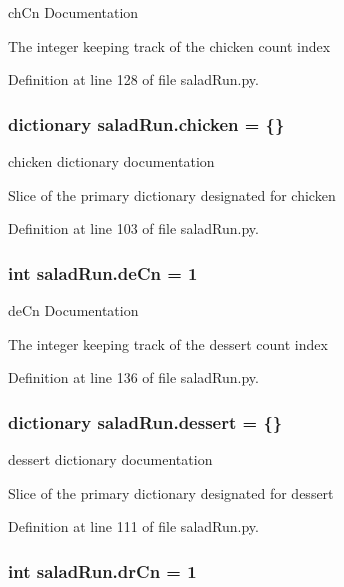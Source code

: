 ch\-Cn Documentation 

The integer keeping track of the chicken count index 

Definition at line 128 of file salad\-Run.\-py.

\hypertarget{namespacesaladRun_a7d8f9a41af35fcb57da7f604d8c726a2}{
\subsubsection[{chicken}]{\setlength{\rightskip}{0pt plus 5cm}dictionary salad\-Run.\-chicken = \{\}}}\label{namespacesaladRun_a7d8f9a41af35fcb57da7f604d8c726a2}


chicken dictionary documentation 

Slice of the primary dictionary designated for chicken 

Definition at line 103 of file salad\-Run.\-py.

\hypertarget{namespacesaladRun_a9299fe14c063bec9d7678991f9228906}{
\subsubsection[{de\-Cn}]{\setlength{\rightskip}{0pt plus 5cm}int salad\-Run.\-de\-Cn = 1}}\label{namespacesaladRun_a9299fe14c063bec9d7678991f9228906}


de\-Cn Documentation 

The integer keeping track of the dessert count index 

Definition at line 136 of file salad\-Run.\-py.

\hypertarget{namespacesaladRun_a36d7bec56ba087e0d5c0cd8adea249ce}{
\subsubsection[{dessert}]{\setlength{\rightskip}{0pt plus 5cm}dictionary salad\-Run.\-dessert = \{\}}}\label{namespacesaladRun_a36d7bec56ba087e0d5c0cd8adea249ce}


dessert dictionary documentation 

Slice of the primary dictionary designated for dessert 

Definition at line 111 of file salad\-Run.\-py.

\hypertarget{namespacesaladRun_af13050935a78f76656311536b6fae6d0}{
\subsubsection[{dr\-Cn}]{\setlength{\rightskip}{0pt plus 5cm}int salad\-Run.\-dr\-Cn = 1}}\label{namespacesaladRun_af13050935a78f76656311536b6fae6d0}


